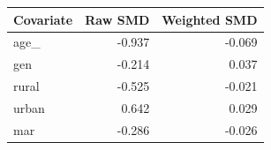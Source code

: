 \begin{tabular}{lrr}
\toprule
Covariate & Raw SMD & Weighted SMD \\
\midrule
age\_ & -0.937 & -0.069 \\
gen & -0.214 & 0.037 \\
rural & -0.525 & -0.021 \\
urban & 0.642 & 0.029 \\
mar & -0.286 & -0.026 \\
\bottomrule
\end{tabular}
